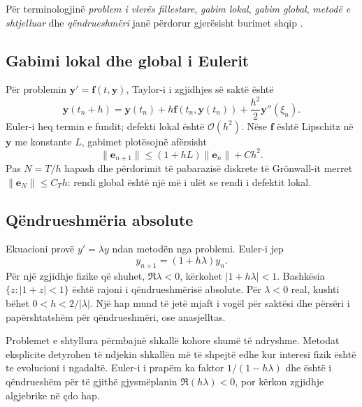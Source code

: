 \documentclass[11pt,oneside,openany]{book}
\newcommand{\vect}[1]{\bm{#1}}
\newcommand{\Oh}{\mathcal{O}}
\begin{document}
Për terminologjinë \emph{problem i vlerës fillestare}, \emph{gabim lokal}, \emph{gabim global}, \emph{metodë e shtjelluar} dhe \emph{qëndrueshmëri} janë përdorur gjerësisht burimet shqip \cite{dishmema,hanelli,hoxha,datja,dishmemaArticle}.



\subsection{Gabimi lokal dhe global i Eulerit}
Për problemin $\vect y'=\vect f(t,\vect y)$, Taylor-i i zgjidhjes së saktë është
\begin{equation}
 \vect y(t_n+h)=\vect y(t_n)+h\vect f(t_n,\vect y(t_n))
 +\frac{h^2}{2}\vect y''(\xi_n).
\end{equation}
Euler-i heq termin e fundit; defekti lokal është $\Oh(h^2)$. Nëse $\vect f$ është Lipschitz në $\vect y$ me konstante $L$, gabimet plotësojnë afërsisht
\begin{equation}
 \|\vect e_{n+1}\|\le(1+hL)\|\vect e_n\|+Ch^2.
\end{equation}
Pas $N=T/h$ hapash dhe përdorimit të pabarazisë diskrete të Grönwall-it merret $\|\vect e_N\|\le C_T h$: rendi global është një më i ulët se rendi i defektit lokal.

\subsection{Qëndrueshmëria absolute}
Ekuacioni provë $y'=\lambda y$ ndan metodën nga problemi. Euler-i jep
\begin{equation}
 y_{n+1}=(1+h\lambda)y_n.
\end{equation}
Për një zgjidhje fizike që shuhet, $\Re\lambda<0$, kërkohet $|1+h\lambda|<1$. Bashkësia $\{z:|1+z|<1\}$ është rajoni i qëndrueshmërisë absolute. Për $\lambda<0$ real, kushti bëhet $0<h<2/|\lambda|$. Një hap mund të jetë mjaft i vogël për saktësi dhe përsëri i papërshtatshëm për qëndrueshmëri, ose anasjelltas.

Problemet e shtyllura përmbajnë shkallë kohore shumë të ndryshme. Metodat eksplicite detyrohen të ndjekin shkallën më të shpejtë edhe kur interesi fizik është te evolucioni i ngadaltë. Euler-i i prapëm ka faktor $1/(1-h\lambda)$ dhe është i qëndrueshëm për të gjithë gjysmëplanin $\Re(h\lambda)<0$, por kërkon zgjidhje algjebrike në çdo hap.
\end{document}

